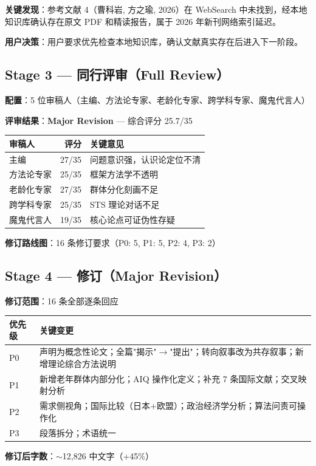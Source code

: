 \documentclass[12pt,a4paper]{article}
\begin{document}
\textbf{关键发现}：参考文献 4（曹科岩, 方之瑜, 2026）在 WebSearch 中未找到，经本地知识库确认存在原文 PDF 和精读报告，属于 2026 年新刊网络索引延迟。

\textbf{用户决策}：用户要求优先检查本地知识库，确认文献真实存在后进入下一阶段。

\subsection{Stage 3 — 同行评审（Full Review）}

\textbf{配置}：5 位审稿人（主编、方法论专家、老龄化专家、跨学科专家、魔鬼代言人）

\textbf{评审结果}：\textbf{Major Revision} — 综合评分 25.7/35

\begin{tabular}{lrl}
\hline
\textbf{审稿人} & \textbf{评分} & \textbf{关键意见} \\
\hline
主编 & 27/35 & 问题意识强，认识论定位不清 \\
方法论专家 & 25/35 & 框架方法学不透明 \\
老龄化专家 & 27/35 & 群体分化刻画不足 \\
跨学科专家 & 25/35 & STS 理论对话不足 \\
魔鬼代言人 & 19/35 & 核心论点可证伪性存疑 \\
\hline
\end{tabular}

\textbf{修订路线图}：16 条修订要求（P0: 5, P1: 5, P2: 4, P3: 2）

\subsection{Stage 4 — 修订（Major Revision）}

\textbf{修订范围}：16 条全部逐条回应

\begin{tabular}{ll}
\hline
\textbf{优先级} & \textbf{关键变更} \\
\hline
P0 & 声明为概念性论文；全篇"揭示"$\rightarrow$"提出"；转向叙事改为共存叙事；新增理论综合方法说明 \\
P1 & 新增老年群体内部分化；AIQ 操作化定义；补充 7 条国际文献；交叉映射分析 \\
P2 & 需求侧视角；国际比较（日本+欧盟）；政治经济学分析；算法问责可操作化 \\
P3 & 段落拆分；术语统一 \\
\hline
\end{tabular}

\textbf{修订后字数}：$\sim$12,826 中文字（+45\%）
\end{document}
